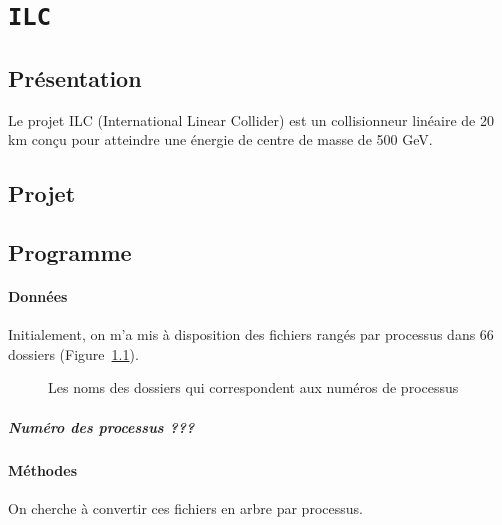\chapter{\texttt{ILC}}

\section{Présentation}

Le projet ILC (International Linear Collider) est un collisionneur linéaire de 20 km
conçu pour atteindre une énergie de centre de masse de 500 GeV. 

\section{Projet \nnhAnalysis}

\section{Programme \processor}

\subsubsection{Données}
Initialement, on m'a mis à disposition des fichiers \SLCIO rangés par processus dans 66 dossiers (Figure~\ref{listeProcessus}).

\begin{figure}[h!]
	\caption{Les noms des dossiers qui correspondent aux numéros de processus}
	\label{listeProcessus}
	
\end{figure}

\paragraph{Numéro des processus ???}


\subsubsection{Méthodes}

On cherche à convertir ces fichiers \SLCIO en arbre \ROOT par processus.

